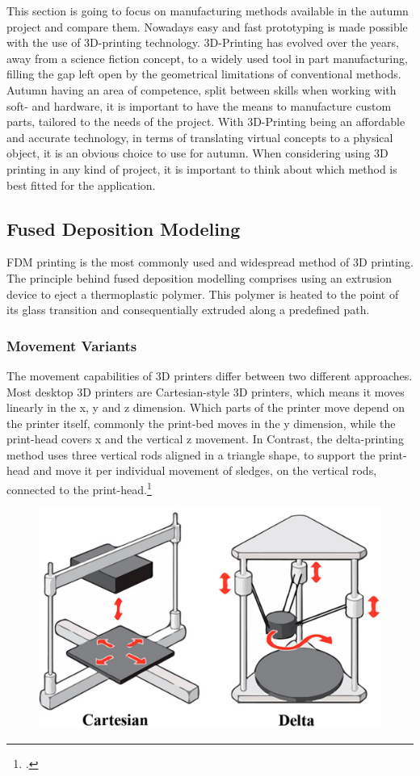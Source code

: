 This section is going to focus on manufacturing methods available in the autumn project and compare them. Nowadays easy and fast prototyping is made possible with the use of 3D-printing technology. 3D-Printing has evolved over the years, away from a science fiction concept, to a widely used tool in part manufacturing, filling the gap left open by the geometrical limitations of conventional methods.\newline
Autumn having an area of competence, split between skills when working with soft- and hardware, it is important to have the means to manufacture custom parts, tailored to the needs of the project. With 3D-Printing being an affordable and accurate technology, in terms of translating virtual concepts to a physical object, it is an obvious choice to use for autumn.
When considering using 3D printing in any kind of project, it is important to think about which method is best fitted for the application.

\subsection{Fused Deposition Modeling}

FDM printing is the most commonly used and widespread method of 3D printing. The principle behind fused deposition modelling comprises using an extrusion device to eject a thermoplastic polymer. This polymer is heated to the point of its glass transition and consequentially extruded along a predefined path.

\subsubsection{Movement Variants}

The movement capabilities of 3D printers differ between two different approaches. Most desktop 3D printers are Cartesian-style 3D printers, which means it moves linearly in the x, y and z dimension.
Which parts of the printer move depend on the printer itself, commonly the print-bed moves in the y dimension, while the print-head covers x and the vertical z movement. In Contrast, the delta-printing method uses three vertical rods aligned in a triangle shape, to support the print-head and move it per individual movement of sledges, on the vertical rods, connected to the print-head.\footcite{all3dpFDM3DPrinting2020}\newline

\begin{figure}[h]
	\centering
	\includegraphics[width=0.6\linewidth]{img/cartesianDeltaPrinting}
	\caption{}
	\label{fig:custom_parts_printerMovement}
\end{figure}

